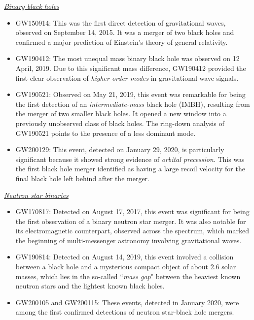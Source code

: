 \noindent\underline{\textit{Binary black holes}}
\begin{itemize}
    \item GW150914: This was the first direct detection of gravitational waves, observed on September 14, 2015. It was a merger of two black holes and confirmed a major prediction of Einstein's theory of general relativity.
    \item GW190412: The most unequal mass binary black hole was observed on 12 April, 2019. Due to this significant mass difference, GW190412 provided the first clear observation of \textit{higher-order modes} in gravitational wave signals.  
    \item GW190521: Observed on May 21, 2019, this event was remarkable for being the first detection of an 
    \textit{intermediate-mass} black hole (IMBH), resulting from the merger of two smaller black holes. It opened a new window into a previously unobserved class of black holes. The ring-down analysis of GW190521 points to the presence of a less dominant mode.
    \item GW200129: This event, detected on January 29, 2020, is particularly significant because it showed strong evidence of \textit{orbital precession}. This was the first black hole merger identified as having a large recoil velocity for the final black hole left behind after the merger.
\end{itemize}

\noindent\underline{\textit{Neutron star binaries}}
\begin{itemize}
    \item GW170817: Detected on August 17, 2017, this event was significant for being the first observation of a binary neutron star merger. It was also notable for its electromagnetic counterpart, observed across the spectrum, which marked the beginning of multi-messenger astronomy involving gravitational waves.
    \item GW190814: Detected on August 14, 2019, this event involved a collision between a black hole and a mysterious compact object of about 2.6 solar masses, which lies in the so-called ``\textit{mass gap}" between the heaviest known neutron stars and the lightest known black holes.
    \item GW200105 and GW200115: These events, detected in January 2020, were among the first confirmed detections of neutron star-black hole mergers. 
\end{itemize}






